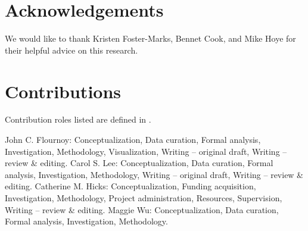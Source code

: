 \documentclass[
  sn-mathphys-ay,
]{sn-jnl}
\begin{document}
\section{Acknowledgements}\label{acknowledgements}

We would like to thank Kristen Foster-Marks, Bennet Cook, and Mike Hoye
for their helpful advice on this research.

\section{Contributions}\label{contributions}

Contribution roles listed are defined in
\citet{nisocreditworkinggroupANSINISOZ3910420222022}.

John C. Flournoy: Conceptualization, Data curation, Formal analysis,
Investigation, Methodology, Visualization, Writing -- original draft,
Writing -- review \& editing. Carol S. Lee: Conceptualization, Data
curation, Formal analysis, Investigation, Methodology, Writing --
original draft, Writing -- review \& editing. Catherine M. Hicks:
Conceptualization, Funding acquisition, Investigation, Methodology,
Project administration, Resources, Supervision, Writing -- review \&
editing. Maggie Wu: Conceptualization, Data curation, Formal analysis,
Investigation, Methodology.


\renewcommand\refname{References}
  
\end{document}
